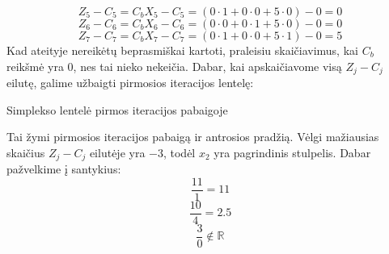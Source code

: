 \documentclass{article}
\begin{document}
\begin{equation*}
    Z_5-C_5=C_bX_5-C_5=(0\cdot1+0\cdot0+5\cdot0)-0=0
\end{equation*}
\begin{equation*}
    Z_6-C_6=C_bX_6-C_6=(0\cdot0+0\cdot1+5\cdot0)-0=0
\end{equation*}
\begin{equation*}
    Z_7-C_7=C_bX_7-C_7=(0\cdot1+0\cdot0+5\cdot1)-0=5
\end{equation*}
Kad ateityje nereikėtų beprasmiškai kartoti, praleisiu skaičiavimus, kai $C_b$ reikšmė yra 0, nes tai nieko nekeičia. Dabar, kai apskaičiavome visą $Z_j-C_j$ eilutę, galime užbaigti pirmosios iteracijos lentelę:
\begin{table}[H]
    \centering
    \caption{Simplekso lentelė pirmos iteracijos pabaigoje}
    \label{table:2}
\end{table}
Tai žymi pirmosios iteracijos pabaigą ir antrosios pradžią. Vėlgi mažiausias skaičius $Z_j-C_j$ eilutėje yra $-3$, todėl $x_2$ yra pagrindinis stulpelis. Dabar pažvelkime į santykius:
\begin{equation*}
    \frac{11}{1} = 11
\end{equation*}
\begin{equation*}
    \frac{10}{4} = 2.5
\end{equation*}
\begin{equation*}
    \frac{3}{0}\not\in \mathbb{R}
\end{equation*}
\end{document}
